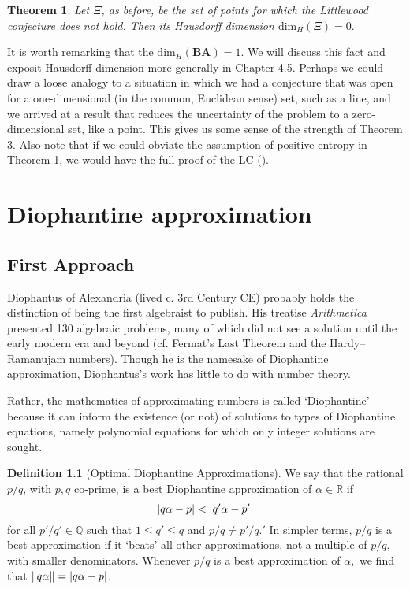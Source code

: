 \documentclass[12pt, letterpaper, oneside]{book}
\newcommand{\ga}{\ensuremath{\alpha}}
\newcommand{\Q}{\mathbb{Q}}
\newcommand{\R}{\mathbb{R}}
\DeclarePairedDelimiter{\abs}{\lvert}{\rvert}
\DeclarePairedDelimiter{\norm}{\lVert}{\rVert}
\theoremstyle{plain}
\newtheorem{theorem}{Theorem}
\theoremstyle{definition}
\newtheorem{definition}{Definition}
\theoremstyle{remark}
\begin{document}
\begin{theorem}
Let $\Xi$, as before, be the set of points for which the Littlewood conjecture does not hold. Then its Hausdorff dimension $\mbox{dim}_H(\Xi)=0.$ 
\end{theorem}

It is worth remarking that the $\mbox{dim}_H(\mathbf{BA}) = 1.$ We will discuss this fact and exposit Hausdorff dimension more generally in Chapter 4.5. Perhaps we could draw a loose analogy to a situation in which we had a conjecture that was open for a one-dimensional (in the common, Euclidean sense) set, such as a line, and we arrived at a result that reduces the uncertainty of the problem to a zero-dimensional set, like a point. This gives us some sense of the strength of Theorem 3. Also note that if we could obviate the assumption of positive entropy in Theorem 1, we would have the full proof of the LC (\cite{Ven08}). 

\chapter{Diophantine approximation}

\section{First Approach}

Diophantus of Alexandria (lived c. 3rd Century CE) probably holds the distinction of being the first algebraist to publish. His treatise
\textit{Arithmetica} presented 130 algebraic problems, many of which
did not see a solution until the early modern era and beyond
(cf. Fermat's Last Theorem and the Hardy--Ramanujam numbers). Though
he is the namesake of Diophantine approximation, Diophantus's work has
little to do with number theory. 

Rather, the mathematics of approximating numbers is called `Diophantine' because it can inform the existence (or not) of solutions to types of Diophantine equations, namely polynomial equations for which only integer solutions are sought. 

\begin{definition}[Optimal Diophantine Approximations]
We say that the rational $p/q$, with $p,q$ co-prime, is a best Diophantine approximation of $\ga \in \R$ if
\[
\abs{q\ga - p} < |q'\ga-p'|
\]
for all $p'/q' \in \Q$ such that $1\leq q'\leq q$ and $p/q \neq p'/q.'$ In simpler terms, $p/q$ is a best approximation if it `beats' all other approximations, not a multiple of $p/q,$ with smaller denominators. Whenever $p/q$ is a best approximation of $\ga,$ we find that $\norm{q\ga}=\abs{q\ga - p}$.
\end{definition}
\end{document}
